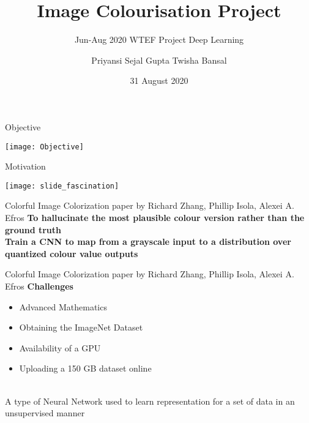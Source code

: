 \documentclass[12pt]{beamer}
\title[Image-Colourization]{Image Colourisation Project}
\subtitle{Jun-Aug 2020 {\textbar} WTEF Project {\textbar} Deep Learning}
\author[Team-9]{Priyansi {\textbar} Sejal Gupta {\textbar} Twisha Bansal}
\date{31 August 2020}
\begin{document}
\begin{frame}
        \titlepage
\end{frame}

\begin{frame}{Objective}
	\begin{center}
		\texttt{[image: Objective]}
	\end{center}
\end{frame}

\begin{frame}{Motivation}
	\begin{center}
		\texttt{[image: slide\_fascination]}
	\end{center}
\end{frame}

\begin{frame}[standout]
\end{frame}

\begin{frame}{Colorful Image Colorization paper by Richard Zhang, Phillip Isola, Alexei A. Efros}
	\textbf{To hallucinate the most plausible colour version rather than the ground truth}\\
	\vspace{10 mm}
	\pause
	\textbf{Train a CNN to map from a grayscale input to a distribution over quantized
	colour value outputs}
\end{frame}

\begin{frame}{Colorful Image Colorization paper by Richard Zhang, Phillip Isola, Alexei A. Efros}
	\textbf{Challenges}\\
	\begin{itemize}
		\item Advanced Mathematics
		\item Obtaining the ImageNet Dataset
		\item Availability of a GPU
		\item Uploading a 150 GB dataset online
	\end{itemize}
\end{frame}

\begin{frame}[standout]
	\\
	A type of Neural Network used to learn representation for a set of data in an unsupervised manner
\end{frame}
\end{document}
